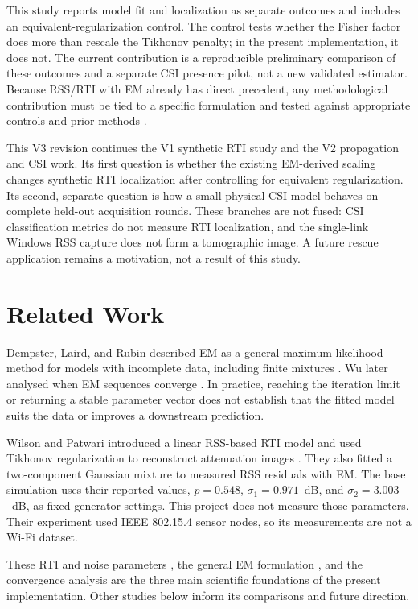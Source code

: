 \documentclass[sensors,article,submit,oneauthor]{Definitions/mdpi}
\begin{document}
This study reports model fit and localization as separate outcomes and includes an equivalent-regularization control. The control tests whether the Fisher factor does more than rescale the Tikhonov penalty; in the present implementation, it does not. The current contribution is a reproducible preliminary comparison of these outcomes and a separate CSI presence pilot, not a new validated estimator. Because RSS/RTI with EM already has direct precedent, any methodological contribution must be tied to a specific formulation and tested against appropriate controls and prior methods \cite{Wilson2010,Kaltiokallio2021,Huang2020}.

This V3 revision continues the V1 synthetic RTI study and the V2 propagation and CSI work. Its first question is whether the existing EM-derived scaling changes synthetic RTI localization after controlling for equivalent regularization. Its second, separate question is how a small physical CSI model behaves on complete held-out acquisition rounds. These branches are not fused: CSI classification metrics do not measure RTI localization, and the single-link Windows RSS capture does not form a tomographic image. A future rescue application remains a motivation, not a result of this study.
\section{Related Work}

Dempster, Laird, and Rubin described EM as a general maximum-likelihood method for models with incomplete data, including finite mixtures \cite{Dempster1977}. Wu later analysed when EM sequences converge \cite{Wu1983}. In practice, reaching the iteration limit or returning a stable parameter vector does not establish that the fitted model suits the data or improves a downstream prediction.

Wilson and Patwari introduced a linear RSS-based RTI model and used Tikhonov regularization to reconstruct attenuation images \cite{Wilson2010}. They also fitted a two-component Gaussian mixture to measured RSS residuals with EM. The base simulation uses their reported values, $p=0.548$, $\sigma_1=0.971$~dB, and $\sigma_2=3.003$~dB, as fixed generator settings. This project does not measure those parameters. Their experiment used IEEE 802.15.4 sensor nodes, so its measurements are not a Wi-Fi dataset.

These RTI and noise parameters \cite{Wilson2010}, the general EM formulation \cite{Dempster1977}, and the convergence analysis \cite{Wu1983} are the three main scientific foundations of the present implementation. Other studies below inform its comparisons and future direction.
\end{document}
